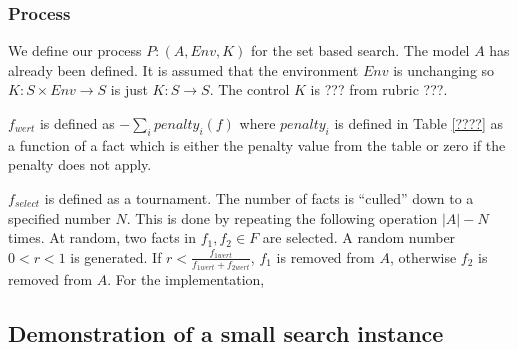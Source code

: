\documentclass{article}
\begin{document}
\subsubsection{Process}

We define our process $P: (A, Env, K)$ for the set based search. The
model $A$ has already been defined. It is assumed that the environment
$Env$ is unchanging so $K: S \times Env \to S$ is just $K: S \to S$.
The control $K$ is ??? from rubric ???.

$f_{wert}$ is defined as $-\sum\limits_{i}^{} penalty_i(f)$ where $
penalty_i$ is defined in Table \ref{????} as a function of a fact
which is either the penalty value from the table or zero if the
penalty does not apply.

$f_{select}$ is defined as a tournament. The number of facts is
``culled'' down to a specified number $N$. This is done by repeating
the following operation $|A|-N$ times. At random, two facts in $f_1,
f_2 \in F$ are selected. A random number $0 < r < 1$ is generated. If
$r < \frac{f_{1wert}}{f_{1wert} + f_{2wert}}$, $f_1$ is removed from
$A$, otherwise $f_2$ is removed from $A$. For the implementation,

\subsection{Demonstration of a small search instance}
\end{document}
